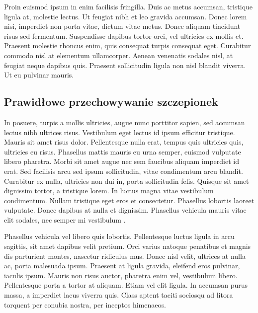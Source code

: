 Proin euismod ipsum in enim facilisis fringilla. Duis ac metus accumsan, tristique ligula at, molestie lectus. Ut feugiat nibh et leo gravida accumsan. Donec lorem nisi, imperdiet non porta vitae, dictum vitae metus. Donec aliquam tincidunt risus sed fermentum. Suspendisse dapibus tortor orci, vel ultricies ex mollis et. Praesent molestie rhoncus enim, quis consequat turpis consequat eget. Curabitur commodo nisl at elementum ullamcorper. Aenean venenatis sodales nisl, at feugiat neque dapibus quis. Praesent sollicitudin ligula non nisl blandit viverra. Ut eu pulvinar mauris.

\subsection{Prawidłowe przechowywanie szczepionek}
In posuere, turpis a mollis ultricies, augue nunc porttitor sapien, sed accumsan lectus nibh ultrices risus. Vestibulum eget lectus id ipsum efficitur tristique. Mauris sit amet risus dolor. Pellentesque nulla erat, tempus quis ultricies quis, ultricies eu risus. Phasellus mattis mauris eu urna semper, euismod vulputate libero pharetra. Morbi sit amet augue nec sem faucibus aliquam imperdiet id erat. Sed facilisis arcu sed ipsum sollicitudin, vitae condimentum arcu blandit. Curabitur ex nulla, ultricies non dui in, porta sollicitudin felis. Quisque sit amet dignissim tortor, a tristique lorem. In luctus magna vitae vestibulum condimentum. Nullam tristique eget eros et consectetur. Phasellus lobortis laoreet vulputate. Donec dapibus at nulla et dignissim. Phasellus vehicula mauris vitae elit sodales, nec semper mi vestibulum \cite{Volmer2016}.



Phasellus vehicula vel libero quis lobortis. Pellentesque luctus ligula in arcu sagittis, sit amet dapibus velit pretium. Orci varius natoque penatibus et magnis dis parturient montes, nascetur ridiculus mus. Donec nisl velit, ultrices at nulla ac, porta malesuada ipsum. Praesent at ligula gravida, eleifend eros pulvinar, iaculis ipsum. Mauris non risus auctor, pharetra enim vel, vestibulum libero. Pellentesque porta a tortor at aliquam. Etiam vel elit ligula. In accumsan purus massa, a imperdiet lacus viverra quis. Class aptent taciti sociosqu ad litora torquent per conubia nostra, per inceptos himenaeos.

